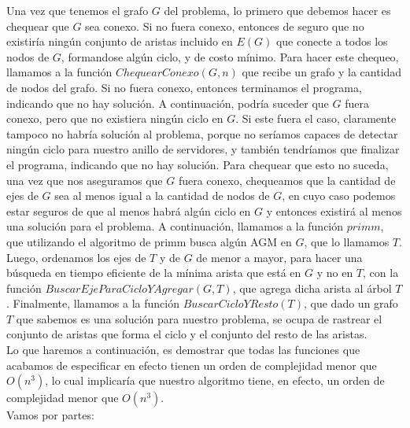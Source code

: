 \documentclass[11pt, a4paper, twoside]{article}
\begin{document}
Una vez que tenemos el grafo $G$ del problema, lo primero que debemos hacer es chequear que $G$
sea conexo. Si no fuera conexo, entonces de seguro que no existiría ningún conjunto de aristas
incluido en $E(G)$ que conecte a todos los nodos de $G$, formandose algún ciclo, y de costo 
mínimo. Para hacer este chequeo, llamamos a la función $ChequearConexo(G,n)$ que recibe un grafo
y la cantidad de nodos del grafo. Si no fuera conexo, entonces terminamos el programa, indicando
que no hay solución. A continuación, podría suceder que $G$ fuera conexo, pero que no existiera
ningún ciclo en $G$. Si este fuera el caso, claramente tampoco no habría solución al problema,
porque no seríamos capaces de detectar ningún ciclo para nuestro anillo de servidores, y también
tendríamos que finalizar el programa, indicando que no hay solución. Para 
chequear que esto no suceda, una vez que nos aseguramos que $G$ fuera conexo, chequeamos que
la cantidad de ejes de $G$ sea al menos igual a la cantidad de nodos de $G$, en cuyo caso podemos
estar seguros de que al menos habrá algún ciclo en $G$ y entonces existirá al menos una solución
para el problema. A continuación, llamamos a la función $primm$, que utilizando el algoritmo de
primm busca algún AGM en $G$, que lo llamamos $T$. Luego, ordenamos los ejes de $T$ y de $G$ de
menor a mayor, para hacer una búsqueda en tiempo eficiente de la mínima arista que está en $G$
y no en $T$, con la función $BuscarEjeParaCicloYAgregar(G,T)$, que agrega dicha arista al 
árbol $T$. Finalmente, llamamos a la función $BuscarCicloYResto(T)$, que dado un grafo $T$ que 
sabemos es una solución para nuestro problema, se ocupa de rastrear el conjunto de aristas que 
forma el ciclo y el conjunto del resto de las aristas. \\
Lo que haremos a continuación, es demostrar que todas las funciones que acabamos de especificar
en efecto tienen un orden de complejidad menor que $O(n^3)$, lo cual implicaría que nuestro
algoritmo tiene, en efecto, un orden de complejidad menor que $O(n^3)$. \\
Vamos por partes:
\end{document}
